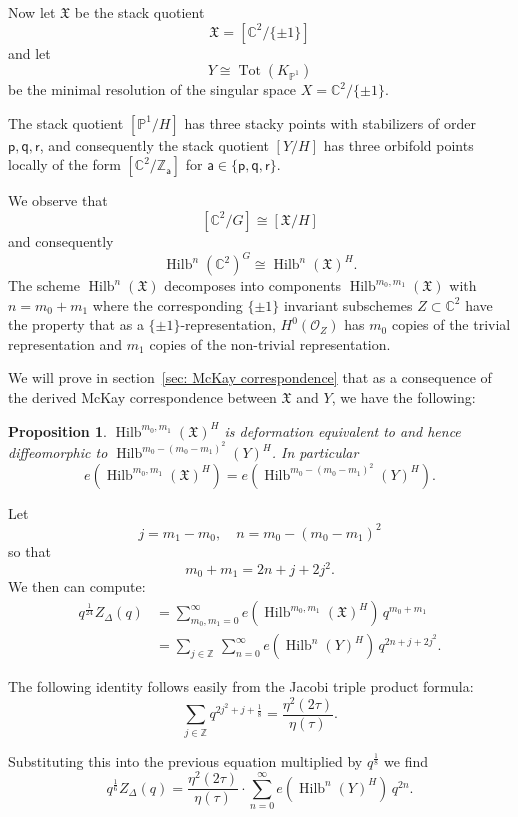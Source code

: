 \documentclass{amsart}
\newtheorem{proposition}[theorem]{Proposition}
\theoremstyle{definition}
\newcommand{\CC} {{\mathbb C}}          %
\newcommand{\ZZ} {{\mathbb Z}}		%
\newcommand{\PP}{\mathbb{P}}
\newcommand{\X}{\mathfrak{X}}
\renewcommand{\O}{\mathcal{O}}
\newcommand{\varp}{\mathsf{p}}
\newcommand{\varq}{\mathsf{q}}
\newcommand{\varr}{\mathsf{r}}
\newcommand{\vara}{\mathsf{a}}
\newcommand{\Hilb}{\operatorname{Hilb}}
\begin{document}
\bigskip

Now let $\X$ be the stack quotient
\[
\X=[\CC^{2}/ \{\pm 1 \}]
\]
and let
\[
Y\cong \operatorname{Tot}(K_{\PP^{1}})
\]
be the minimal resolution of the singular space $X=\CC^{2}/\{\pm 1
\}$.

The stack quotient $[\PP^{1}/H]$ has three stacky points with
stabilizers of order $\varp ,\varq ,\varr$, and consequently the stack
quotient $[Y/H]$ has three orbifold points locally of the form
$[\CC^{2}/\ZZ_{\vara }]$ for $\vara \in \{\varp ,\varq ,\varr \}$.


We observe that 
\[
 [\CC^{2}/G ] \cong [\X /H ]
\]
and consequently
\[
\Hilb^{n}(\CC^{2})^{G}  \cong \Hilb^{n}(\X )^{H} .
\]
The scheme $ \Hilb^{n}(\X )$ decomposes into components
$\Hilb^{m_{0},m_{1}}(\X )$ with $n=m_{0}+m_{1}$ where the
corresponding $\{\pm 1 \}$ invariant subschemes $Z\subset \CC^{2}$
have the property that as a $\{\pm 1 \}$-representation,
$H^{0}(\O_{Z})$ has $m_{0}$ copies of the trivial representation and
$m_{1}$ copies of the non-trivial representation.

We will prove in section~\ref{sec: McKay correspondence} that as a
consequence of the derived McKay correspondence between $\X$ and $Y$,
we have the following:
\begin{proposition}\label{prop: Hilb(X,m0,m1) = Hilb(Y,m0-(m0-m1)^2)}
$\Hilb^{m_{0},m_{1}}(\X )^{H}$ is deformation equivalent to and hence
diffeomorphic to $\Hilb^{m_{0}-(m_{0}-m_{1})^{2}}(Y)^{H}$. In
particular
\[
e\left(\Hilb^{m_{0},m_{1}}(\X )^{H} \right)
=e\left(\Hilb^{m_{0}-(m_{0}-m_{1})^{2}}(Y)^{H} \right). 
\]
\end{proposition}

Let
\[
j=m_{1}-m_{0}, \quad n=m_{0}-(m_{0}-m_{1})^{2} 
\]
so that
\[
m_{0}+m_{1} = 2n +j + 2j^{2}. 
\]
We then can compute:
\begin{align*}
q^{\frac{1}{24}} Z_{\Delta}(q) &= \sum_{m_{0},m_{1}= 0}^{\infty } 
e\left(\Hilb^{m_{0},m_{1}}(\X )^{H} \right) \, q^{m_{0}+m_{1}} \\
&= \sum_{j\in \ZZ}\,  \sum_{n=0}^{\infty} e\left(\Hilb^{n}(Y)^{H}
\right)\, q^{2n+j+2j^{2}}.
\end{align*}

The following identity follows easily from the Jacobi triple product
formula:
\[
\sum_{j\in \ZZ} q^{2j^{2}+j+\frac{1}{8}} = \frac{\eta^{2}(2\tau )}{\eta (\tau )}.
\]

Substituting this into the previous equation multiplied by
$q^{\frac{1}{8}}$ we find
\[
q^{\frac{1}{6}} Z_{\Delta}(q) =  \frac{\eta^{2}(2\tau )}{\eta (\tau )} \cdot
\sum_{n=0}^{\infty}  e\left(\Hilb^{n}(Y)^{H}
\right)\, q^{2n}.
\]
\end{document}
